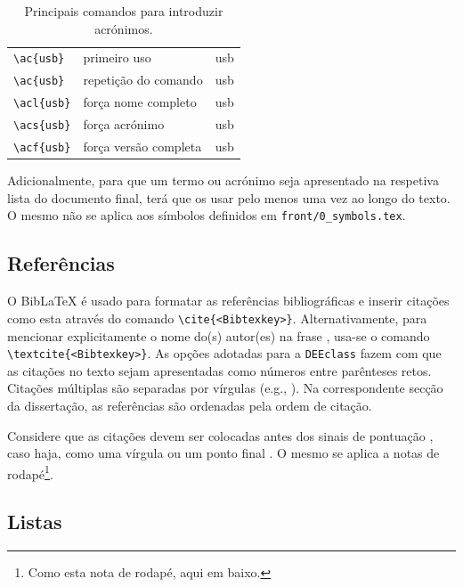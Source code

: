 \begin{table}[htb]
	\caption{Principais comandos para introduzir acrónimos.}
	\label{tab:acros}
	\centering
	\begin{tabular}{l l l}
	\toprule
	\tabhead{Comando} & \tabhead{} & \tabhead{Resultado} \\
	\midrule
		\verb|\ac{usb}| & primeiro uso & \ac{usb}\\
		\verb|\ac{usb}| & repetição do comando & \ac{usb}\\
		\verb|\acl{usb}| & força nome completo & \acl{usb}\\
		\verb|\acs{usb}| & força acrónimo & \acs{usb}\\
		\verb|\acf{usb}| & força versão completa & \acf{usb}\\
	\bottomrule
	\end{tabular}
\end{table}

Adicionalmente, para que um termo ou acrónimo seja apresentado na respetiva lista do documento final, terá que os usar pelo menos uma vez ao longo do texto. O mesmo não se aplica aos símbolos definidos em \verb|front/0_symbols.tex|.


\subsection{Referências}

O Bib\LaTeX{} é usado para formatar as referências bibliográficas e inserir citações como esta \cite{Gupta97} através do comando \verb|\cite{<Bibtexkey>}|. Alternativamente, para mencionar explicitamente o nome do(s) autor(es) na frase \textcite{Delorme1995}, usa-se o comando \verb|\textcite{<Bibtexkey>}|. As opções adotadas para a \verb|DEEclass| fazem com que as citações no texto sejam apresentadas como números entre parênteses retos. Citações múltiplas são separadas por vírgulas (e.g., \cite{Lipsum2008,Li2000,Candy1992}). Na correspondente secção da dissertação, as referências são ordenadas pela ordem de citação. 

Considere que as citações \cite{W3C2005,ATmega128A2019} devem ser colocadas antes dos sinais de pontuação \cite{Candy1992}, caso haja, como uma vírgula ou um ponto final \cite{IEA2024}. O mesmo se aplica a notas de rodapé\footnote{Como esta nota de rodapé, aqui em baixo.}.


\subsection{Listas}

